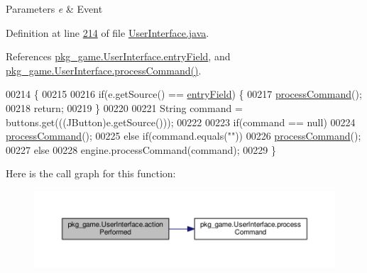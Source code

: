 \begin{DoxyParams}{Parameters}
{\em e} & Event \\
\hline
\end{DoxyParams}


Definition at line \hyperlink{UserInterface_8java_source_l00214}{214} of file \hyperlink{UserInterface_8java_source}{User\-Interface.\-java}.



References \hyperlink{UserInterface_8java_source_l00030}{pkg\-\_\-game.\-User\-Interface.\-entry\-Field}, and \hyperlink{UserInterface_8java_source_l00234}{pkg\-\_\-game.\-User\-Interface.\-process\-Command()}.


\begin{DoxyCode}
00214                                                \{
00215 
00216         \textcolor{keywordflow}{if}(e.getSource() == \hyperlink{classpkg__game_1_1UserInterface_ae405fc2ad81ccf31aad56484a9c1c2bc}{entryField}) \{
00217             \hyperlink{classpkg__game_1_1UserInterface_ae708d0c4af18579b5c9fc3b671fcc03f}{processCommand}();
00218             \textcolor{keywordflow}{return};
00219         \}
00220 
00221         String command = buttons.get(((JButton)e.getSource()));
00222 
00223         \textcolor{keywordflow}{if}(command == null)
00224             \hyperlink{classpkg__game_1_1UserInterface_ae708d0c4af18579b5c9fc3b671fcc03f}{processCommand}();
00225         \textcolor{keywordflow}{else} \textcolor{keywordflow}{if}(command.equals(\textcolor{stringliteral}{""}))
00226             \hyperlink{classpkg__game_1_1UserInterface_ae708d0c4af18579b5c9fc3b671fcc03f}{processCommand}();
00227         \textcolor{keywordflow}{else}
00228             engine.processCommand(command);
00229     \}
\end{DoxyCode}


Here is the call graph for this function\-:
\nopagebreak
\begin{figure}[H]
\begin{center}
\leavevmode
\includegraphics[width=350pt]{classpkg__game_1_1UserInterface_a55cb092ba130a286917cbd6c064136b2_cgraph}
\end{center}
\end{figure}


